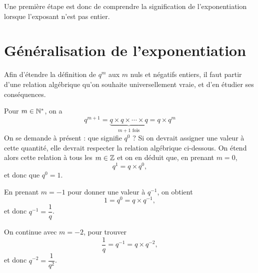Une première étape est donc de comprendre la signification de l'exponentiation lorsque l'exposant n'est pas entier.

\section{Généralisation de l'exponentiation}




Afin d'étendre la définition de $q^m$ aux $m$ nuls et négatifs entiers, il faut partir d'une relation algébrique qu'on souhaite universellement vraie, et d'en étudier ses conséquences.

Pour $m\in\mathbb{N}^*$, on a 
	\[ q^{m+1} = \underbrace{q \times q \times \cdots \times q}_{\text{$m+1$ fois}} = q \times q^{m} \]
On se demande à présent : que signifie $q^0$ ?
Si on devrait assigner une valeur à cette quantité, elle devrait respecter la relation algébrique ci-dessous.
On étend alors cette relation à tous les $m\in\mathbb{Z}$ et on en déduit que, en prenant $m=0$,
	\[ q^1 = q \times q^{0}, \]
et donc que $q^0 = 1$.

En prenant $m=-1$ pour donner une valeur à $q^{-1}$, on obtient
	\[ 1 = q^{0} = q \times q^{-1}, \]
et donc $q^{-1} = \dfrac1q$.

On continue avec $m=-2$, pour trouver
	\[ \dfrac1q = q^{-1} = q \times q^{-2}, \]
et donc $q^{-2} = \dfrac1{q^2}$.


